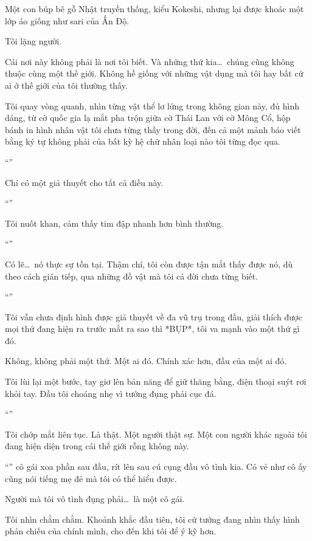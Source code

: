 \documentclass[../main.tex]{subfiles}
\begin{document}
Một con búp bê gỗ Nhật truyền thống, kiểu Kokeshi, nhưng lại được khoác một lớp áo giống như sari của Ấn Độ.

Tôi lặng người.

Cái nơi này không phải là nơi tôi biết. Và những thứ kia\dots\ chúng cũng không thuộc cùng một thế giới. Không hề giống với những vật dụng mà tôi hay bất cứ ai ở thế giới của tôi thường thấy.

Tôi quay vòng quanh, nhìn từng vật thể lơ lửng trong không gian này, đủ hình dáng, từ cờ quốc gia lạ mắt pha trộn giữa cờ Thái Lan với cờ Mông Cổ, hộp bánh in hình nhân vật tôi chưa từng thấy trong đời, đến cả một mảnh báo viết bằng ký tự không phải của bất kỳ hệ chữ nhân loại nào tôi từng đọc qua.

``''

Chỉ có một giả thuyết cho tất cả điều này.

``''

Tôi nuốt khan, cảm thấy tim đập nhanh hơn bình thường.

``''

Có lẽ\dots\ nó thực sự tồn tại. Thậm chí, tôi còn được tận mắt thấy được nó, dù theo cách gián tiếp, qua những đồ vật mà tôi cả đời chưa từng biết.

``''

Tôi vẫn chưa định hình được giả thuyết về đa vũ trụ trong đầu, giải thích được mọi thứ đang hiện ra trước mắt ra sao thì *BỤP*, tôi va mạnh vào một thứ gì đó.

Không, không phải một thứ. Một ai đó. Chính xác hơn, đầu của một ai đó.

Tôi lùi lại một bước, tay giơ lên bản năng để giữ thăng bằng, điện thoại suýt rơi khỏi tay. Đầu tôi choáng nhẹ vì tưởng đụng phải cục đá.

``''

Tôi chớp mắt liên tục. Là thật. Một người thật sự. Một con người khác ngoài tôi đang hiện diện trong cái thế giới rỗng không này.

``'' cô gái xoa phần sau đầu, rít lên sau cú cụng đầu vô tình kia. Có vẻ như cô ấy cũng nói tiếng mẹ đẻ mà tôi có thể hiểu được.

Người mà tôi vô tình đụng phải\dots\ là một cô gái.

Tôi nhìn chằm chằm. Khoảnh khắc đầu tiên, tôi cứ tưởng đang nhìn thấy hình phản chiếu của chính mình, cho đến khi tôi để ý kỹ hơn.
\end{document}
